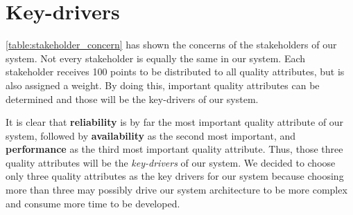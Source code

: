 \section{Key-drivers}

\autoref{table:stakeholder_concern} has shown the concerns of the stakeholders of our system. Not every stakeholder is equally the same in our system. Each stakeholder receives 100 points to be distributed to all quality attributes, but is also assigned a weight. By doing this, important quality attributes can be determined and those will be the key-drivers of our system.

It is clear that \textbf{reliability} is by far the most important quality attribute of our system, followed by \textbf{availability} as the second most important, and \textbf{performance} as the third most important quality attribute. Thus, those three quality attributes will be the \textit{key-drivers} of our system. We decided to choose only three quality attributes as the key drivers for our system because choosing more than three may possibly drive our system architecture to be more complex and consume more time to be developed.